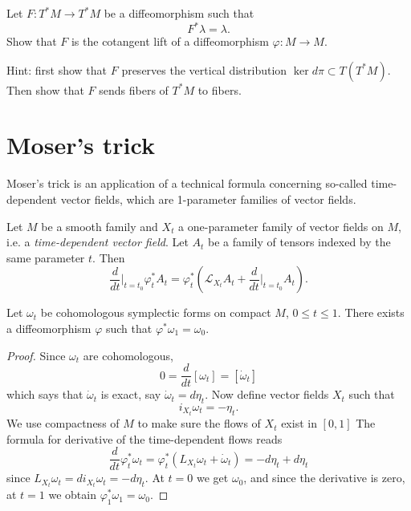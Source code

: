 \begin{exercise}
\label{exercise-cotangent-lift-char}
Let $F:T^*M \to T^*M$ be a
diffeomorphism such that
$$
F^*\lambda=\lambda.
$$
Show that $F$ is the cotangent lift of a
diffeomorphism $\varphi:M \to M$.

\noindent
Hint: first show that $F$ preserves the
vertical distribution
$\ker d\pi \subset T(T^*M)$.
Then show that $F$ sends fibers of
$T^*M$ to fibers.
\end{exercise}

\section{Moser's trick}
\label{section-moser-trick}

\noindent
Moser's trick is an application of a
technical formula concerning so-called
time-dependent vector fields, which
are 1-parameter families of vector fields.

\begin{lemma}
\label{lemma-lie-deriv-time-depen-vecto}
\begin{reference}
\cite[Proposition 22.15]{les}
\end{reference}
Let $M$ be a smooth family and $X_t$ a
one-parameter family of vector fields
on $M$, i.e. a {\it time-dependent vector
field}.
Let $A_t$ be a family of tensors indexed by
the same parameter $t$.
Then
$$
\frac{d}{dt}\Big|_{t=t_0}\varphi^* _tA_t
=\varphi^*_t\left(\mathcal{L}_{X_t}A_t+
\frac{d}{dt}\Big|_{t=t_0}A_t\right).
$$
\end{lemma}

\begin{theorem}
\label{theorem-moser-trick}
Let $\omega_t$ be cohomologous
symplectic forms on compact $M$,
$0\leq t\leq 1$.
There exists a diffeomorphism
$\varphi$ such that $\varphi^*\omega_1
=\omega_0$.
\end{theorem}

\begin{proof}
Since $\omega_t$ are cohomologous,
$$
0=\frac{d}{dt}[\omega_t]
=[\dot\omega_t]
$$
which says that $\dot\omega_t$ is exact,
say $\dot\omega_t=d\eta_t$.
Now define vector fields $X_t$
such that
$$
i_{X_t}\omega_t=-\eta_t.
$$
We use compactness of $M$
to make sure the flows of $X_t$
exist in $[0,1]$
The formula for 
derivative of the time-dependent flows reads
$$
\frac{d}{dt}\varphi_t^*\omega_t
=\varphi_t^* (L_{X_t}\omega_t+\dot \omega_t)
=-d\eta_t+d\eta_t
$$
since $L_{X_t}\omega_t = di_{X_t}\omega_t=
-d\eta_t$. At $t=0$ we get $\omega_0$,
and since the derivative is zero,
at $t=1$ we obtain 
$\varphi_1^*\omega_1=\omega_0$.
\end{proof}

